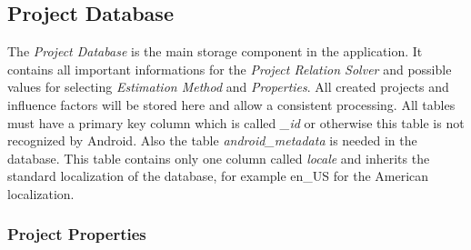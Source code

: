 \subsection{Project Database}

The \textit{Project Database} is the main storage component in the application. It contains all important informations for the \textit{Project Relation Solver} and possible values for selecting \textit{Estimation Method} and \textit{Properties}. All created projects and influence factors will be stored here and allow a consistent processing. All tables must have a primary key column which is called \textit{\_id} or otherwise this table is not recognized by Android. Also the table \textit{android\_metadata} is needed in the database. This table contains only one column called \textit{locale} and inherits the standard localization of the database, for example {en\_US} for the American localization.\\

\subsubsection{Project Properties}\label{ProjectProperties}

